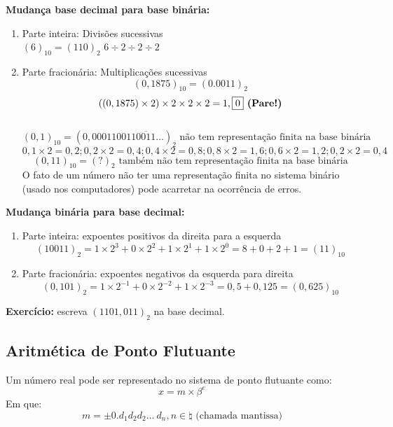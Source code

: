 \documentclass[a4paper,oneside,article,table]{article}
\begin{document}
            \textbf{Mudança base decimal para base binária:}
            \begin{enumerate}

                \item Parte inteira: Divisões sucessivas\\
                    ${(6)}_{10} = {(110)}_2$ $6\div2\div2\div2$
                \item Parte fracionária: Multiplicações sucessivas\\
                    \[{(0,1875)}_{10} = {(0.0011)}_2\]
                    \[((0,1875)\times2)\times2\times2\times2 = 1,\boxed{0} \textrm{\textbf{ (Pare!)}}\] 
                    \\
                    \[{(0,1)}_{10} = {(0,000110011\overline{0011}\ldots)}_2 \textrm{ não tem representação finita na base binária}\] %
                    \[0,1\times2 = 0,2; 0,2\times2 = 0,4; 0,4\times2 = 0,8; 0,8\times2=1,6; 0,6\times2=1,2; 0,2\times2 = 0,4\] %
                    \[{(0,11)}_{10} = {(?)}_2 \textrm{ também não tem representação finita na base binária}\]
                    O fato de um número não ter uma representação finita no sistema binário (usado nos computadores) pode acarretar na ocorrência de erros.

            \end{enumerate}

            \textbf{Mudança binária para base decimal:}
            \begin{enumerate}
                    \item Parte inteira: expoentes positivos da direita para a esquerda
                        \[{(10011)}_2 = 1\times2^3 + 0\times2^2 + 1\times2^1 + 1\times2^0 = 8 + 0 + 2 + 1 = {(11)}_{10}\]
                        \item Parte fracionária: expoentes negativos da esquerda para direita
                        \[{(0,101)}_2 = 1\times2^{-1} + 0\times2^{-2} + 1\times2^{-3} = 0,5 + 0,125 = {(0,625)}_{10}\]
            \end{enumerate}

            \textbf{Exercício:} escreva ${(1101,011)}_2$ na base decimal.

            \subsection{Aritmética de Ponto Flutuante}
            Um número real pode ser representado no sistema de ponto flutuante como:
            \[x = m\times\beta^e\]
            Em que:
            \[m = \pm 0.d_1d_2d_2\ldots~d_n, n \in \natural \textrm{ (chamada mantissa)}\]
\end{document}

